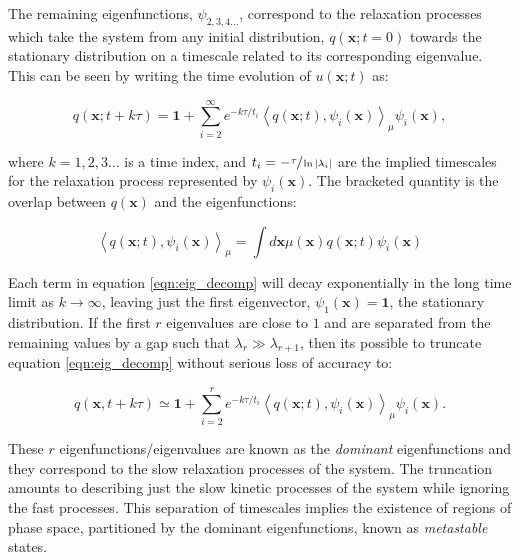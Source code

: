 The remaining eigenfunctions, $\psi_{2,3,4...}$, correspond to the relaxation processes which take the system from any initial distribution, $q(\mathbf{x} ; t=0)$ towards the stationary distribution on a timescale related to its corresponding eigenvalue. This can be seen by writing the time evolution of $u(\mathbf{x};t)$ as:

\begin{equation}\label{eqn:eig_decomp}
q(\mathbf{x} ; t+k \tau)=\mathbf{1}+\sum_{i=2}^{\infty} e^{-k \tau / t_{i}}\left\langle q(\mathbf{x} ; t), \psi_{i}(\mathbf{x})\right\rangle_{\mu} \psi_{i}(\mathbf{x}),
\end{equation}

where $k=1,2,3 \ldots$ is a time index, and $t_{i}=-\sfrac{\tau}{\ln{|\lambda_{i}|}}$ are the implied timescales for the relaxation process represented by $\psi_{i}(\mathbf{x})$. The bracketed quantity is the overlap between $q(\mathbf{x})$ and the eigenfunctions:

\begin{equation}
\left\langle q(\mathbf{x} ; t), \psi_{i}(\mathbf{x})\right\rangle_{\mu}=\int d \mathbf{x} \mu(\mathbf{x}) q(\mathbf{x} ; t) \psi_{i}(\mathbf{x})
\end{equation}

Each term in equation \ref{eqn:eig_decomp} will decay exponentially in the long time limit as $k \rightarrow \infty$, leaving just the first eigenvector, $\psi_{1}(\mathbf{x})=\mathbf{1}$, the stationary distribution. If the first $r$ eigenvalues are close to $1$ and are separated from the remaining values by a gap such that $\lambda_{r} \gg \lambda_{r+1}$, then its possible to truncate equation \ref{eqn:eig_decomp} without serious loss of accuracy to:

\begin{equation}\label{eqn:eig_decomp_to_r}
q(\mathbf{x},  t+k \tau)  \simeq \mathbf{1}+\sum_{i=2}^{r} e^{-k \tau / t_{i}}\left\langle q(\mathbf{x} ; t), \psi_{i}(\mathbf{x})\right\rangle_{\mu} \psi_{i}(\mathbf{x}).
\end{equation}

These $r$ eigenfunctions/eigenvalues are known as the \emph{dominant} eigenfunctions and they correspond to the slow relaxation processes of the system. The truncation amounts to describing just the slow kinetic processes of the system while ignoring the fast processes. This separation of timescales implies the existence of regions of phase space, partitioned by the dominant eigenfunctions, known as \emph{metastable} states. 

